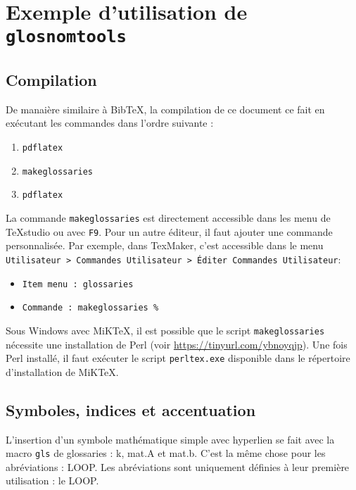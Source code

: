 \documentclass[PhD,nohyperref,english,french]{ulthese}
\begin{document}
\frontmatter                    %

\pagetitre

\begin{SingleSpace}
\abnormalparskip{0pt}
\printglossary[title=Nomenclature]
\end{SingleSpace}

\mainmatter                     %

\chapter{Exemple d'utilisation de \texttt{glosnomtools}}

\section{Compilation}
De manaière similaire à BibTeX, la compilation de ce document ce fait en exécutant les commandes dans l'ordre suivante :
\begin{enumerate}
	\item \texttt{pdflatex}
	\item \texttt{makeglossaries}
	\item \texttt{pdflatex}
\end{enumerate}
La commande \texttt{makeglossaries} est directement accessible dans les menu de TeXstudio ou avec \texttt{F9}. Pour un autre éditeur, il faut ajouter une commande personnalisée. Par exemple, dans TexMaker, c’est accessible dans le menu \texttt{Utilisateur > Commandes Utilisateur > Éditer Commandes Utilisateur}:
\begin{itemize}
	\item \texttt{Item menu : glossaries} 
	\item \texttt{Commande : makeglossaries \%}
\end{itemize}
Sous Windows avec MiKTeX, il est possible que le script \texttt{makeglossaries} nécessite une installation de Perl (voir \url{https://tinyurl.com/ybnoyqjp}). Une fois Perl installé, il faut exécuter le script \texttt{perltex.exe} disponible dans le répertoire d'installation de MiKTeX.

\section{Symboles, indices et accentuation}
L'insertion d'un symbole mathématique simple avec hyperlien se fait avec la macro \texttt{gls} de glossaries : \gls{k}, \gls{mat.A} et \gls{mat.b}. C'est la même chose pour les abréviations : \gls{LOOP}. Les abréviations sont uniquement définies à leur première utilisation : le \gls{LOOP}.
\end{document}
